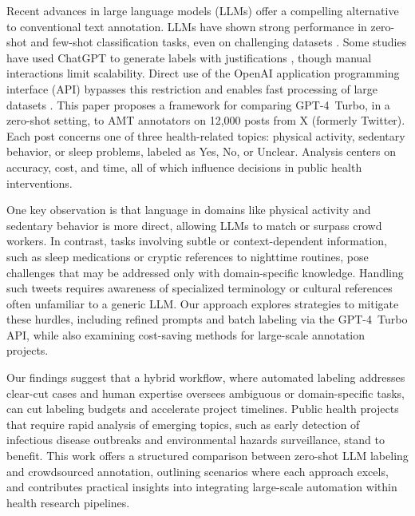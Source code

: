 \documentclass[letterpaper, 10 pt, conference]{ieeeconf} %
\begin{document}
Recent advances in large language models (LLMs) offer a compelling alternative to conventional text annotation. LLMs have shown strong performance in zero-shot and few-shot classification tasks, even on challenging datasets \cite{brown2020language,radford2019language,qin2023chatgptgeneralpurposenaturallanguage}. Some studies have used ChatGPT to generate labels with justifications \cite{törnberg2023chatgpt4outperformsexpertscrowd,zhu2023chatgptreproducehumangeneratedlabels}, though manual interactions limit scalability. Direct use of the OpenAI application programming interface (API) bypasses this restriction and enables fast processing of large datasets \cite{Gilardi_2023}. This paper proposes a framework for comparing GPT-4~Turbo, in a zero-shot setting, to AMT annotators on 12,000 posts from X (formerly Twitter). Each post concerns one of three health-related topics: physical activity, sedentary behavior, or sleep problems, labeled as \textquotesingle{}Yes\textquotesingle{}, \textquotesingle{}No\textquotesingle{}, or \textquotesingle{}Unclear\textquotesingle{}. Analysis centers on accuracy, cost, and time, all of which influence decisions in public health interventions.

One key observation is that language in domains like physical activity and sedentary behavior is more direct, allowing LLMs to match or surpass crowd workers. In contrast, tasks involving subtle or context-dependent information, such as sleep medications or cryptic references to nighttime routines, pose challenges that may be addressed only with domain-specific knowledge. Handling such tweets requires awareness of specialized terminology or cultural references often unfamiliar to a generic LLM. Our approach explores strategies to mitigate these hurdles, including refined prompts and batch labeling via the GPT-4~Turbo API, while also examining cost-saving methods for large-scale annotation projects.

Our findings suggest that a hybrid workflow, where automated labeling addresses clear-cut cases and human expertise oversees ambiguous or domain-specific tasks, can cut labeling budgets and accelerate project timelines. Public health projects that require rapid analysis of emerging topics, such as early detection of infectious disease outbreaks and environmental hazards surveillance, stand to benefit. This work offers a structured comparison between zero-shot LLM labeling and crowdsourced annotation, outlining scenarios where each approach excels, and contributes practical insights into integrating large-scale automation within health research pipelines. 
\end{document}
